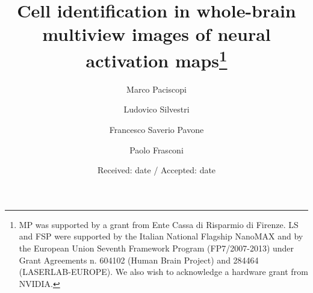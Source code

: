 \documentclass[smallextended]{svjour3}       %
\begin{document}
\title{Cell identification in whole-brain multiview images of neural activation
maps\thanks{MP was supported by a grant from Ente Cassa di Risparmio di Firenze.
LS and FSP were supported by the Italian National Flagship
NanoMAX and by the European Union Seventh Framework Program (FP7/2007-2013)
under Grant Agreements n. 604102 (Human Brain Project) and 284464 (LASERLAB-EUROPE).
We also wish to acknowledge a hardware grant from NVIDIA.}
}


\author{Marco Paciscopi  \and
        Ludovico Silvestri \and
        Francesco Saverio Pavone \and
        Paolo Frasconi
}



\date{Received: date / Accepted: date}
\end{document}
